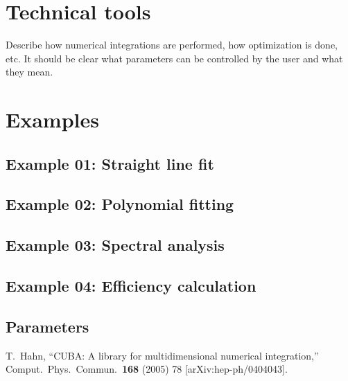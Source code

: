 \documentclass[11pt, a4paper]{article}
\begin{document}
\section{Technical tools} 
\label{section:tools} 

Describe how numerical integrations are performed, how optimization is
done, etc. It should be clear what parameters can be controlled by the
user and what they mean.


\section{Examples}


\subsection{Example 01: Straight line fit} 


\subsection{Example 02: Polynomial fitting} 


\subsection{Example 03: Spectral analysis} 


\subsection{Example 04: Efficiency calculation} 


\begin{appendix}

\section{Parameters} 

\end{appendix} 


%
\begin{thebibliography}{99}
  T.~Hahn, ``CUBA: A library for multidimensional numerical
  integration,'' Comput.\ Phys.\ Commun.\ {\bf 168} (2005) 78
  [arXiv:hep-ph/0404043].
\end{thebibliography}
\end{document}

